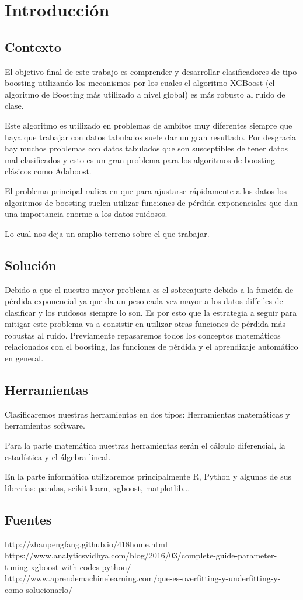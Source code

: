 \chapter{Introducción}

\section{Contexto}

El objetivo final de este trabajo es comprender y desarrollar clasificadores de tipo boosting utilizando los mecanismos por los cuales el algoritmo XGBoost (el algoritmo de Boosting más utilizado a nivel global) es más robusto al ruido de clase.  

Este algoritmo es utilizado en problemas de ambitos muy diferentes siempre que haya que trabajar con datos tabulados suele dar un gran resultado.  
Por desgracia hay muchos problemas con datos tabulados que son susceptibles de tener datos mal clasificados y esto es un gran problema para los algoritmos de boosting clásicos como Adaboost.  

El problema principal radica en que para ajustarse rápidamente a los datos los algoritmos de boosting suelen utilizar funciones de pérdida exponenciales que dan una importancia enorme a los datos ruidosos. 

Lo cual nos deja un amplio terreno sobre el que trabajar.

\section{Solución}
Debido a que el nuestro mayor problema es el sobreajuste debido a la función de pérdida exponencial ya que da un peso cada vez mayor a los datos difíciles de clasificar y los ruidosos siempre lo son.  
Es por esto que la estrategia a seguir para mitigar este problema va a consistir en utilizar otras funciones de pérdida más robustas al ruido.  
Previamente repasaremos todos los conceptos matemáticos relacionados con el boosting, las funciones de pérdida y el aprendizaje automático en general. 

\section{Herramientas}
Clasificaremos nuestras herramientas en dos tipos: Herramientas matemáticas y herramientas software.  

Para la parte matemática nuestras herramientas serán el cálculo diferencial, la estadística y el álgebra lineal.  

En la parte informática utilizaremos principalmente R, Python y algunas de sus librerías: pandas, scikit-learn, xgboost, matplotlib...

\section{Fuentes}

http://zhanpengfang.github.io/418home.html
https://www.analyticsvidhya.com/blog/2016/03/complete-guide-parameter-tuning-xgboost-with-codes-python/
http://www.aprendemachinelearning.com/que-es-overfitting-y-underfitting-y-como-solucionarlo/
